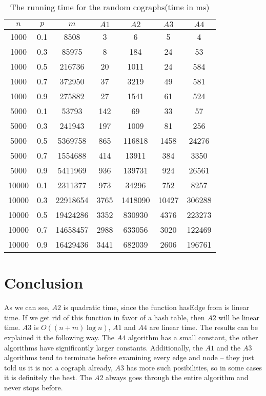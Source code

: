   \begin{center}
  \begin{table}[]
      \centering
    \begin{tabular}[
    caption = {Random cographs},
    label = {tbl:random_cographs},
  ]{ | c | c | c | c | c | c | c |}
  \hline
   $n$ & $p$ & $m$ & $A1$ & $A2$ & $A3$ & $A4$ \\ [0.5ex] 
 \hline\hline
  1000 & 0.1 & 8508 & 3 & 6 & 5 & 4 \\
 \hline
 1000 & 0.3 & 85975 & 8 & 184 & 24 & 53 \\
\hline
 1000 & 0.5 & 216736 & 20 & 1011 & 24 & 584 \\
\hline
 1000 & 0.7 & 372950 & 37 & 3219 & 49 & 581 \\
\hline
 1000 & 0.9 & 275882 & 27 & 1541 & 61 & 524 \\
\hline
 5000 & 0.1 & 53793 & 142 & 69 & 33 & 57 \\
\hline
 5000 & 0.3 & 241943 & 197 & 1009 & 81 & 256 \\
\hline
 5000 & 0.5 & 5369758 & 865 & 116818 & 1458 & 24276 \\
\hline
5000 & 0.7 & 1554688 & 414 & 13911 & 384 & 3350 \\
\hline
 5000 & 0.9 & 5411969 & 936 & 139731 & 924 & 26561 \\
\hline
10000 & 0.1 & 2311377 & 973 & 34296 & 752 & 8257 \\
\hline
10000 & 0.3 & 22918654 & 3765 & 1418090 & 10427 & 306288 \\
\hline
10000 & 0.5 & 19424286 & 3352 & 830930 & 4376 & 223273 \\
\hline
10000 & 0.7 & 14658457 & 2988 & 633056 & 3020 & 122469 \\
\hline
10000 & 0.9 & 16429436 & 3441 & 682039 & 2606 & 196761 \\
\hline
  \end{tabular}
  \caption{The running time for the random cographs(time in ms)}
      \label{tab:random_cographs}
  \end{table}
  \end{center}

  \section{Conclusion}
  As we can see, $A2$ is quadratic time, since the function hasEdge from \cite{NKT+23} is linear time. If we get rid of this function in favor of a hash table, then $A2$ will be linear time. $A3$ is $O((n+m)\log{n})$, $A1$ and $A4$ are linear time. The results can be explained it the following way. The $A4$ algorithm has a small constant, the other algorithms have significantly larger constants. Additionally, the $A1$ and the $A3$ algorithms tend to terminate before examining every edge and node -- they just told us it is not a cograph already, $A3$ has more such posibilities, so in some cases it is definitely the best. The $A2$ always goes through the entire algorithm and never stops before. 